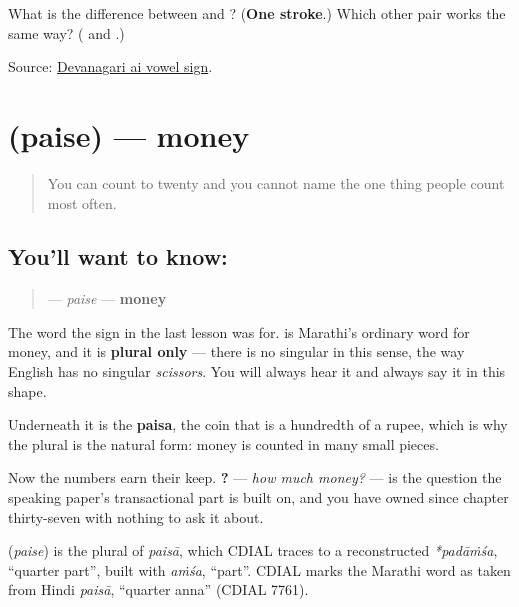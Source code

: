 \begin{tcolorbox}[breakable,colback=teal!4,colframe=teal!35!black,title={Before you move on}]
What is the difference between \textbf{} and \textbf{}? (\textbf{One stroke}.) Which other pair works the same way? (\textbf{} and \textbf{}.)

Source: \href{https://en.wiktionary.org/wiki/\%E0\%A5\%88}{Devanagari ai vowel sign}.
\end{tcolorbox}
\section[\texorpdfstring{\mr{पैसे} (paise)}{पैसे (paise)}]{ (paise) — money}

\label{lesson:MR-C59-paise}



\begin{quote}
You can count to twenty and you cannot name the one thing people count most often.
\end{quote}

\subsection*{You'll want to know: }
\begin{quote}
\textbf{} — \emph{paise} — \textbf{money}
\end{quote}

The word the sign in the last lesson was for. \textbf{} is Marathi's ordinary word for money, and it is \textbf{plural only} — there is no singular \emph{} in this sense, the way English has no singular \emph{scissors}. You will always hear it and always say it in this shape.

Underneath it is the \textbf{paisa}, the coin that is a hundredth of a rupee, which is why the plural is the natural form: money is counted in many small pieces.

Now the numbers earn their keep. \textbf{ ?} — \emph{how much money?} — is the question the speaking paper's transactional part is built on, and you have owned \textbf{} since chapter thirty-seven with nothing to ask it about.

\begin{cousinweb}
\textbf{} (\emph{paise}) is the plural of \emph{paisā}, which CDIAL traces to a reconstructed \emph{*padāṁśa}, \textquotedblleft{}quarter part\textquotedblright{}, built with \emph{aṁśa}, \textquotedblleft{}part\textquotedblright{}. CDIAL marks the Marathi word as taken from Hindi \emph{paisā}, \textquotedblleft{}quarter anna\textquotedblright{} (CDIAL 7761).
\end{cousinweb}

